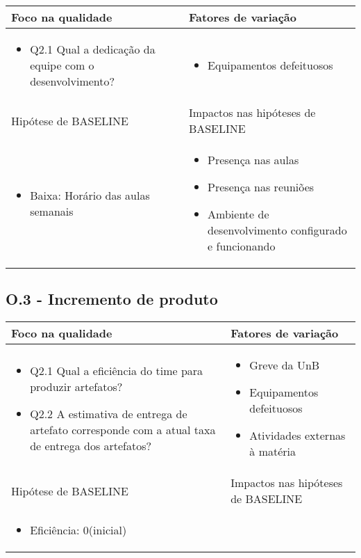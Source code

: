 	\begin{tabular}{ |p{6cm}|p{6cm}|  }
	 \hline
	 Foco na qualidade 		& 		Fatores de variação \\
	 \hline
	 \begin{itemize} \item Q2.1 Qual a dedicação da equipe com o desenvolvimento? \end{itemize} & \begin{itemize} \item Equipamentos defeituosos \end{itemize}\\
	 \hline
	 Hipótese de BASELINE 		& 		Impactos nas hipóteses de BASELINE \\
	 \hline
	 \begin{itemize} \item Baixa: Horário das aulas semanais  \end{itemize} 		& 		\begin{itemize} \item Presença nas aulas \item Presença nas reuniões 
	 \item Ambiente de desenvolvimento configurado e funcionando \end{itemize} \\
	 \hline
	\end{tabular}

\subsection{O.3 - Incremento de produto}

	\begin{tabular}{ |p{6cm}|p{6cm}|  }
	 \hline
	 Foco na qualidade 		& 		Fatores de variação \\
	 \hline
	 \begin{itemize} \item Q2.1 Qual a eficiência do time para produzir artefatos? \item Q2.2 A estimativa de entrega de artefato corresponde com a atual taxa de entrega dos artefatos?\end{itemize} & \begin{itemize} \item Greve da UnB \item Equipamentos defeituosos \item Atividades externas à matéria \end{itemize}\\
	 \hline
	 Hipótese de BASELINE 		& 		Impactos nas hipóteses de BASELINE \\
	 \hline
	 \begin{itemize} \item Eficiência: 0(inicial) \end{itemize} & \\ 
	 \hline
	\end{tabular}
